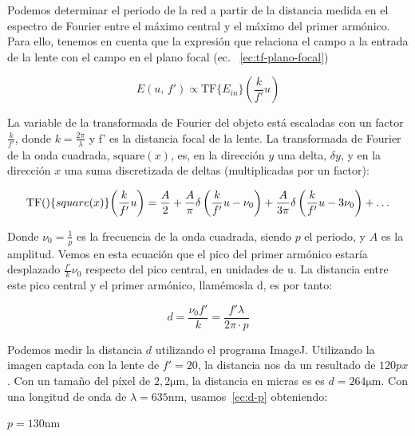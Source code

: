 \documentclass{./packages/optica-article}
\begin{document}
Podemos determinar el periodo de la red a partir de la distancia medida en el espectro de Fourier entre el máximo central y el máximo del primer armónico. Para ello, tenemos en cuenta que la expresión que relaciona el campo a la entrada de la lente con el campo en el plano focal (ec. ~\ref{ec:tf-plano-focal})

\begin{equation}
    E(u,\,f') \propto \textrm{TF}\{E_{in}\}\left(\frac{k}{f'}u\right)
    \label{ec:tf-plano-focal}
\end{equation}

La variable de la transformada de Fourier del objeto está escaladas con un factor $\frac{k}{f'}$, donde $k=\frac{2\pi}{\lambda}$ y f' es la distancia focal de la lente. La transformada de Fourier de la onda cuadrada, $\textrm{square}(x)$, es, en la dirección $y$ una delta, $\delta y$, y en la dirección $x$ una suma discretizada de deltas (multiplicadas por un factor):

\begin{equation}
    \textrm{TF}\qty\{square(x)\}\qty(\frac{k}{f'}u) = \frac{A}{2} + \frac{A}{\pi}  \delta\left(\frac{k}{f'} u - \nu_0\right) + \frac{A}{3\pi} \delta\left(\frac{k}{f'}u - 3\nu_0\right) + \ldots
\end{equation}

Donde $\nu_0 = \frac{1}{p}$ es la frecuencia de la onda cuadrada, siendo $p$ el periodo, y $A$ es la amplitud. Vemos en esta ecuación que el pico del primer armónico estaría desplazado $\frac{f'}{k} \nu_0$ respecto del pico central, en unidades de u. La distancia entre este pico central y el primer armónico, llamémosla d, es por tanto:

\begin{equation}
    d = \frac{\nu_0 f'}{k} = \frac{f'\lambda}{2\pi \cdot p}
    \label{ec:d-p}
\end{equation}

Podemos medir la distancia $d$ utilizando el programa ImageJ. Utilizando la imagen captada con la lente de $f' = 20$, la distancia nos da un resultado de $120 px$. Con un tamaño del píxel de $2,2 \unit{\micro\meter}$, la distancia en micras es es $d = 264 \unit{\micro\meter}$. Con una longitud de onda de $\lambda = 635 \unit{\nano\meter}$, usamos~\ref{ec:d-p} obteniendo:

\begin{center}
    $p = 130 \unit{\nano\meter}$
\end{center}
\end{document}
